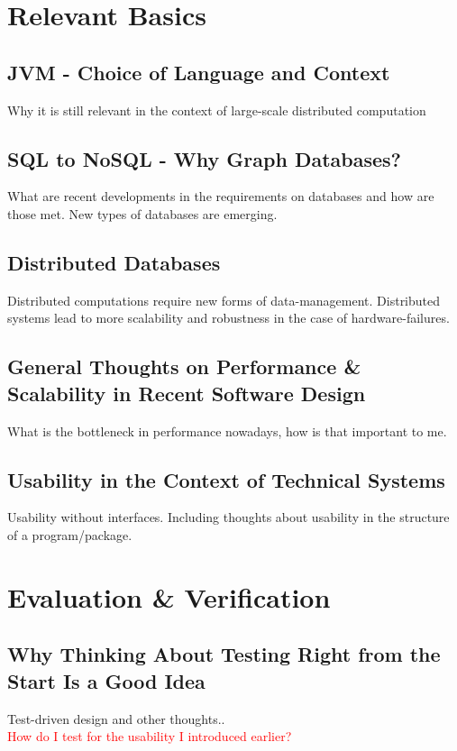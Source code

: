 \documentclass[twoside, 11pt]{scrartcl}
\begin{document}
\section{Relevant Basics}
\label{sec:basics}
\subsection{JVM - Choice of Language and Context}
\label{sec:jvm}
Why it is still relevant in the context of large-scale distributed computation
\subsection{SQL to NoSQL - Why Graph Databases?}
What are recent developments in the requirements on databases and how are those met. New types of databases are emerging.
\subsection{Distributed Databases}
Distributed computations require new forms of data-management. Distributed systems lead to more scalability and robustness in the case of hardware-failures.
\subsection{General Thoughts on Performance \& Scalability in Recent Software Design}
What is the bottleneck in performance nowadays, how is that important to me.

\subsection{Usability in the Context of Technical Systems}
Usability without interfaces. Including thoughts about usability in the structure of a program/package.



\section{Evaluation \& Verification}
\label{sec:evaluation}
\subsection{Why Thinking About Testing Right from the Start Is a Good Idea}
Test-driven design and other thoughts..\\
\textcolor{red}{How do I test for the usability I introduced earlier?}
\end{document}

